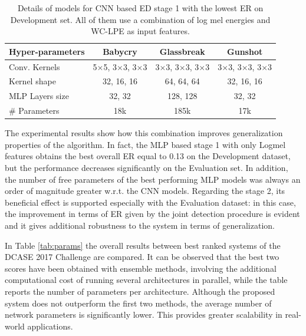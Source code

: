 \begin{table}[b]
	\centering	
		\begin{tabular}{|l|c|c|c|}
			\hline
			Hyper-parameters & Babycry                            & Glassbreak                         & Gunshot                            \\ \hline
			Conv. Kernels    & 5$\times$5, 3$\times$3, 3$\times$3 & 3$\times$3, 3$\times$3, 3$\times$3 & 3$\times$3, 3$\times$3, 3$\times$3 \\
			Kernel shape     & 32, 16, 16                         & 64, 64, 64                         & 32, 16, 16                         \\
			MLP Layers size  & 32, 32                             & 128, 128                           & 32, 32                             \\ \hline
			\# Parameters    & 18k                            & 185k                           & 17k                           \\ \hline
		\end{tabular}
	\caption[[Rare Sound Event Detection - ED Stage 1 Best models]{Details of models for CNN based ED stage 1 with the lowest ER on Development set. All of them use a combination of log mel energies and WC-LPE as input features.}
	\label{tab:CNN_details}
\end{table}
The experimental results show how this combination improves generalization properties of the algorithm. In fact, the MLP based stage 1 with only Logmel features obtains the best overall ER equal to 0.13 on the Development dataset, but the performance decreases significantly on the Evaluation set. In addition, the number of free parameters of the best performing MLP models was always an order of magnitude greater w.r.t. the CNN models. Regarding the stage 2, its beneficial effect is supported especially with the Evaluation dataset: in this case, the improvement in terms of ER given by the joint detection procedure is evident and it gives additional robustness to the system in terms of generalization.

In Table \ref{tab:params} the overall results between best ranked systems of the DCASE 2017 Challenge are compared. It can be observed that the best two scores have been obtained with ensemble methods, involving the additional computational cost of running several architectures in parallel, while the table reports the number of parameters per architecture. Although the proposed system does not outperform the first two methods, the average number of network parameters is significantly lower. This provides greater scalability in real-world applications.

